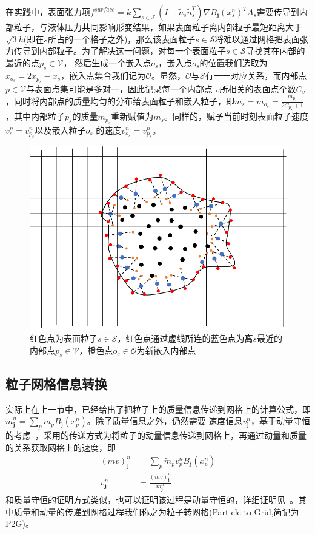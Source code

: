 在实践中，表面张力项$f^{surface} = k\sum_{s\in \mathcal{S}}(I - \tilde{n}_s\tilde{n}_s^T)\nabla B_{\mathbf{j}}(x_s^n)^TA_s$需要传导到内部粒子，与液体压力共同影响形变结果，如果表面粒子离内部粒子最短距离大于
$\sqrt{3}h$(即在$s$所占的一个格子之外)，那么该表面粒子$s\in \mathcal{S}$将难以通过网格把表面张力传导到内部粒子。为了解决这一问题，对每一个表面粒子$s\in \mathcal{S}$寻找其在内部的最近的点$p_s \in \mathcal{V}$，
然后生成一个嵌入点$o_s$，嵌入点$o_s$的位置我们选取为$x_{o_s} = 2x_{p_s} - x_s$，嵌入点集合我们记为$\mathcal{O}$。显然，$\mathcal{O}$与$\mathcal{S}$有一一对应关系，而内部点$p\in\mathcal{V}$与表面点集可能是多对一，因此记录每一个内部点
$v$所相关的表面点个数$C_v$，同时将内部点的质量均匀的分布给表面粒子和嵌入粒子，即$m_s = m_{o_s} = \frac{m_{p_s}}{2C_{p_s} + 1}$，其中内部粒子$p_s$的质量$m_{p_s}$重新赋值为$m_s$。同样的，赋予当前时刻表面粒子速度$v_s^n = v_{p_s}^n$以及嵌入粒子$o_s$
的速度$v_{o_s}^n = v_{p_s}^n$。
\begin{figure}[htbp]
    \centering
    \includegraphics[scale=0.7]{./images/image16.png}
    \caption[内嵌粒子图示]{红色点为表面粒子$s\in \mathcal{S}$，红色点通过虚线所连的蓝色点为离$s$最近的内部点$p_s\in \mathcal{V}$，橙色点$o_s\in \mathcal{O}$为新嵌入内部点}
    \label{fig: surface particle inserted}
\end{figure}
\subsection{粒子网格信息转换}
实际上在上一节中，已经给出了把粒子上的质量信息传递到网格上的计算公式，即$\tilde{m}^n_{\mathbf{j}} = \sum_p \tilde{m}_p B_{\mathbf{j}}(x_p^n)$。除了质量信息之外，仍然需要
速度信息$v_\mathbf{j}^n$，基于动量守恒的考虑~\cite{jiang2016material}，采用的传递方式为将粒子的动量信息传递到网格上，再通过动量和质量的关系获取网格上的速度，即
\begin{align}
    (mv)_\mathbf{j}^n &= \sum_{p} \tilde{m}_p v_p^nB_{\mathbf{j}}(x_p^n)\\
    v_\mathbf{j}^n &= \frac{(mv)_\mathbf{j}^n}{m_{\mathbf{j}}^n} 
\end{align}
和质量守恒的证明方式类似，也可以证明该过程是动量守恒的，详细证明见~\cite{jiang2016material}。其中质量和动量的传递到网格过程我们称之为粒子转网格(Particle to Grid,简记为P2G)。

